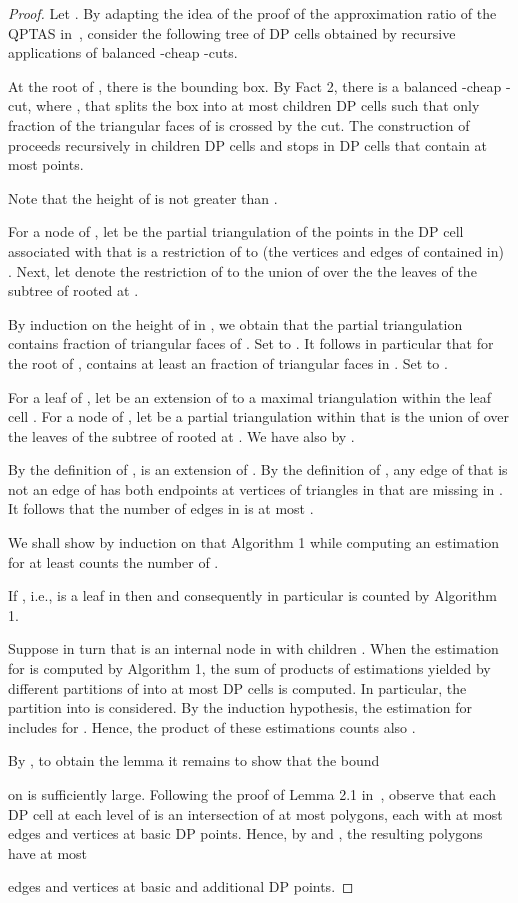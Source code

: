 \documentclass[a4paper]{article}
\begin{document}
\begin{proof}
Let . By adapting the idea
of the proof of the approximation ratio
of the QPTAS in~\cite{AW14}, consider the following
tree  of DP cells obtained by recursive
applications of balanced -cheap -cuts.

At the root of , there is the bounding box.
By Fact 2, there is a balanced -cheap -cut,
where ,
that splits
the box into at most  children DP cells such that only
 fraction of the triangular faces
of  is crossed by the cut. The construction
of  proceeds recursively in children DP cells
and stops in DP cells that contain at most
 points.

Note that the height of 
is not greater than .

For a node  of , let  
be the partial triangulation
of the points in the DP cell  associated
with  that is a restriction of 
to (the vertices and edges of  contained in) .
Next, let  denote
the restriction of  to
the union of  over the 
the leaves  of the subtree of  rooted
at .

By induction on the height 
of  in , we obtain that
the partial triangulation 
contains  fraction
of triangular faces of .
Set  to .
It follows in particular that
for the root  of ,
 contains
at least an  fraction of triangular faces
in . Set  to .


For a leaf  of , let 
be an extension of  to a maximal
triangulation within the leaf cell .
For a node  of , let 
be a partial triangulation within 
that is the union of 
over the leaves  of the subtree of  rooted
at . We have also 
by . 

By the definition of ,
 is an extension of .
By the definition of ,
any edge of  that
is not an edge of 
has both endpoints at vertices
of triangles in  that are
missing in . It follows
that the number of edges
in 
is at most
.

We shall show by induction on 
that Algorithm 1 while computing
an estimation for  
at least counts 
the number of .

If , i.e.,  is a leaf
in  then  and consequently 
in particular 
is counted by  Algorithm 1.

Suppose in turn that  is an internal
node in  with  children .
When the estimation 
for  is computed by Algorithm 1, the sum
of products of estimations yielded by
different partitions of  into at most
 DP cells is computed. In particular,
the partition into  is
considered. By the induction
hypothesis, the estimation for
 includes  
for . Hence,
the product of these estimations
counts also . 

By , to obtain the lemma 
it remains to show that the bound

on  is sufficiently large. 
Following the proof of Lemma 2.1 in~\cite{AW14},
observe that each DP cell  at each level
of  is an intersection of at most
 polygons, each with
at most  edges and vertices at basic DP points.
Hence, by 
and ,
the resulting polygons have at
most 

edges and vertices at basic and additional
DP points.
\end{proof} 
\end{document}
